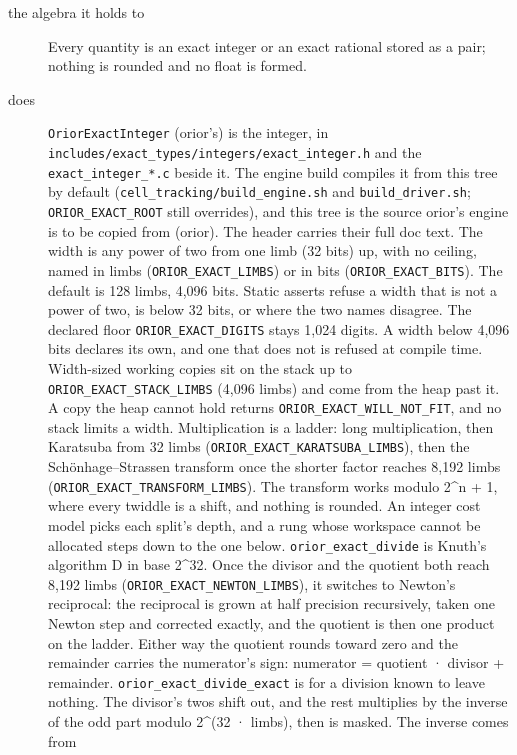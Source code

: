 \begin{description}
\item[{the algebra it holds to}] Every quantity is an exact integer or an exact rational stored as a pair; nothing is rounded and no float is formed.
\item[{does}] \texttt{Orior\allowbreak{}Exact\allowbreak{}Integer} (orior's) is the integer, in \texttt{includes/\allowbreak{}exact\_\allowbreak{}types/\allowbreak{}integers/\allowbreak{}exact\_\allowbreak{}integer.\allowbreak{}h} and the \texttt{exact\_\allowbreak{}integer\_\allowbreak{}*.\allowbreak{}c} beside it. The engine build compiles it from this tree by default (\texttt{cell\_\allowbreak{}tracking/\allowbreak{}build\_\allowbreak{}engine.\allowbreak{}sh} and \texttt{build\_\allowbreak{}driver.\allowbreak{}sh}; \texttt{ORIOR\_\allowbreak{}EXACT\_\allowbreak{}ROOT} still overrides), and this tree is the source orior's engine is to be copied from (orior). The header carries their full doc text. The width is any power of two from one limb (32 bits) up, with no ceiling, named in limbs (\texttt{ORIOR\_\allowbreak{}EXACT\_\allowbreak{}LIMBS}) or in bits (\texttt{ORIOR\_\allowbreak{}EXACT\_\allowbreak{}BITS}). The default is 128 limbs, 4,096 bits. Static asserts refuse a width that is not a power of two, is below 32 bits, or where the two names disagree. The declared floor \texttt{ORIOR\_\allowbreak{}EXACT\_\allowbreak{}DIGITS} stays 1,024 digits. A width below 4,096 bits declares its own, and one that does not is refused at compile time. Width-sized working copies sit on the stack up to \texttt{ORIOR\_\allowbreak{}EXACT\_\allowbreak{}STACK\_\allowbreak{}LIMBS} (4,096 limbs) and come from the heap past it. A copy the heap cannot hold returns \texttt{ORIOR\_\allowbreak{}EXACT\_\allowbreak{}WILL\_\allowbreak{}NOT\_\allowbreak{}FIT}, and no stack limits a width. Multiplication is a ladder: long multiplication, then Karatsuba from 32 limbs (\texttt{ORIOR\_\allowbreak{}EXACT\_\allowbreak{}KARATSUBA\_\allowbreak{}LIMBS}), then the Schönhage–Strassen transform once the shorter factor reaches 8,192 limbs (\texttt{ORIOR\_\allowbreak{}EXACT\_\allowbreak{}TRANSFORM\_\allowbreak{}LIMBS}). The transform works modulo 2\textasciicircum{}n + 1, where every twiddle is a shift, and nothing is rounded. An integer cost model picks each split's depth, and a rung whose workspace cannot be allocated steps down to the one below. \texttt{orior\_\allowbreak{}exact\_\allowbreak{}divide} is Knuth's algorithm D in base 2\textasciicircum{}32. Once the divisor and the quotient both reach 8,192 limbs (\texttt{ORIOR\_\allowbreak{}EXACT\_\allowbreak{}NEWTON\_\allowbreak{}LIMBS}), it switches to Newton's reciprocal: the reciprocal is grown at half precision recursively, taken one Newton step and corrected exactly, and the quotient is then one product on the ladder. Either way the quotient rounds toward zero and the remainder carries the numerator's sign: numerator = quotient · divisor + remainder. \texttt{orior\_\allowbreak{}exact\_\allowbreak{}divide\_\allowbreak{}exact} is for a division known to leave nothing. The divisor's twos shift out, and the rest multiplies by the inverse of the odd part modulo 2\textasciicircum{}(32 · limbs), then is masked. The inverse comes from 
\end{description}
